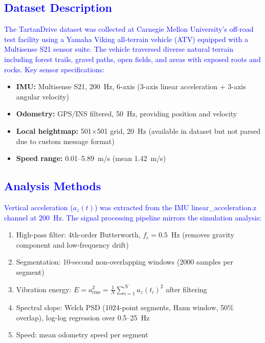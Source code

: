\documentclass[11pt]{article}
\begin{document}
\textcolor{blue}{\subsection{Dataset Description}}

\textcolor{blue}{The TartanDrive dataset\cite{Triest2022} was collected at Carnegie Mellon University's off-road test facility using a Yamaha Viking all-terrain vehicle (ATV) equipped with a Multisense S21 sensor suite. The vehicle traversed diverse natural terrain including forest trails, gravel paths, open fields, and areas with exposed roots and rocks. Key sensor specifications:}

{\color{blue}
\begin{itemize}
\item \textbf{IMU:} Multisense S21, 200~Hz, 6-axis (3-axis linear acceleration + 3-axis angular velocity)
\item \textbf{Odometry:} GPS/INS filtered, 50~Hz, providing position and velocity
\item \textbf{Local heightmap:} 501$\times$501 grid, 20~Hz (available in dataset but not parsed due to custom message format)
\item \textbf{Speed range:} 0.01--5.89~m/s (mean 1.42~m/s)
\end{itemize}
}

\textcolor{blue}{\subsection{Analysis Methods}}

\textcolor{blue}{Vertical acceleration ($a_z(t)$) was extracted from the IMU linear\_acceleration.z channel at 200~Hz. The signal processing pipeline mirrors the simulation analysis:}

{\color{blue}
\begin{enumerate}
\item High-pass filter: 4th-order Butterworth, $f_c = 0.5$~Hz (removes gravity component and low-frequency drift)
\item Segmentation: 10-second non-overlapping windows (2000 samples per segment)
\item Vibration energy: $E = a_{\mathrm{rms}}^2 = \frac{1}{N}\sum_{i=1}^N a_z(t_i)^2$ after filtering
\item Spectral slope: Welch PSD (1024-point segments, Hann window, 50\% overlap), log-log regression over 0.5--25~Hz
\item Speed: mean odometry speed per segment
\end{enumerate}
}
\end{document}
